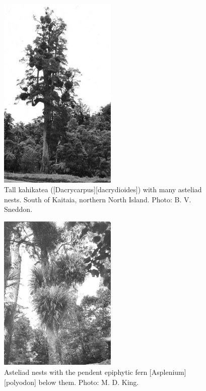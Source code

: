 \begin{figure}
	\includegraphics[width=0.5\textwidth]{graphics/figure39kahikatea.jpg}
	\centering
	\caption[Tall kahikatea with many asteliad nests]{Tall kahikatea ([Dacrycarpus][dacrydioides]) with many asteliad nests.
	South of Kaitaia, northern North Island.
	Photo: B. V. Sneddon.}%
	\label{fig:39kahikatea}
\end{figure}

\begin{figure}
	\includegraphics[width=0.5\textwidth]{graphics/figure40asteliad.jpg}
	\centering
	\caption[Asteliad nests with the pendent epiphytic fern]{Asteliad nests with the pendent epiphytic fern [Asplenium][polyodon] below them.
	Photo: M. D. King.}%
	\label{fig:40asteliad}
\end{figure}

